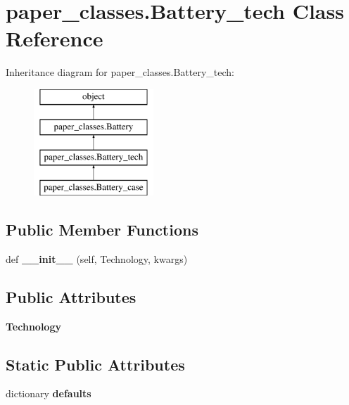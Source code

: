 \hypertarget{classpaper__classes_1_1_battery__tech}{}\section{paper\+\_\+classes.\+Battery\+\_\+tech Class Reference}
\label{classpaper__classes_1_1_battery__tech}
Inheritance diagram for paper\+\_\+classes.\+Battery\+\_\+tech\+:\begin{figure}[H]
\begin{center}
\leavevmode
\includegraphics[height=4.000000cm]{classpaper__classes_1_1_battery__tech}
\end{center}
\end{figure}
\subsection*{Public Member Functions}
\begin{DoxyCompactItemize}
\item 
\mbox{\label{classpaper__classes_1_1_battery__tech_af553b8a2a757e1b9dad5c9c61d0bd591}} 
def {\bfseries \+\_\+\+\_\+init\+\_\+\+\_\+} (self, Technology, kwargs)
\end{DoxyCompactItemize}
\subsection*{Public Attributes}
\begin{DoxyCompactItemize}
\item 
\mbox{\label{classpaper__classes_1_1_battery__tech_a5eded59507fad6e8f232e72399c5fe0e}} 
{\bfseries Technology}
\end{DoxyCompactItemize}
\subsection*{Static Public Attributes}
\begin{DoxyCompactItemize}
\item 
dictionary {\bfseries defaults}
\end{DoxyCompactItemize}


